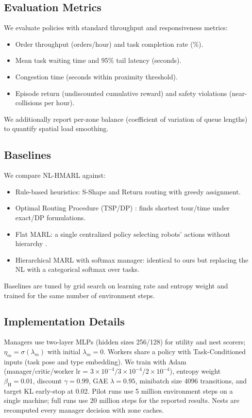 \documentclass[journal,onecolumn]{IEEEtran}
\begin{document}
\subsection{Evaluation Metrics}
We evaluate policies with standard throughput and responsiveness metrics:
\begin{itemize}[leftmargin=1.5em]
  \item Order throughput (orders/hour) and task completion rate (\%).
  \item Mean task waiting time and 95\% tail latency (seconds).
  \item Congestion time (seconds within proximity threshold).
  \item Episode return (undiscounted cumulative reward) and safety violations (near-collisions per hour).
\end{itemize}
We additionally report per-zone balance (coefficient of variation of queue lengths) to quantify spatial load smoothing.

\subsection{Baselines}
We compare NL-HMARL against:
\begin{itemize}[leftmargin=1.5em]
  \item Rule-based heuristics: S-Shape and Return routing \citep{ratliff1983sshape} with greedy assignment.
  \item Optimal Routing Procedure (TSP/DP) \citep{de_koster1997optimal}: finds shortest tour/time under exact/DP formulations.
  \item Flat MARL: a single centralized policy selecting robots' actions without hierarchy \citep{alam2024dqn}.
  \item Hierarchical MARL with softmax manager: identical to ours but replacing the NL with a categorical softmax over tasks.
\end{itemize}
Baselines are tuned by grid search on learning rate and entropy weight and trained for the same number of environment steps.

\subsection{Implementation Details}
Managers use two-layer MLPs (hidden sizes 256/128) for utility and nest scorers; \(\eta_m=\sigma(\lambda_m)\) with initial \(\lambda_m=0\). Workers share a policy with Task-Conditioned inputs (task pose and type embedding). We train with Adam (manager/critic/worker lr = \(3\times10^{-4}/3\times10^{-4}/2\times10^{-4}\)), entropy weight \(\beta_{\mathrm{H}}=0.01\), discount \(\gamma=0.99\), GAE \(\lambda=0.95\), minibatch size 4096 transitions, and target KL early-stop at 0.02. Pilot runs use 5 million environment steps on a single machine; full runs use 20 million steps for the reported results. Nests are recomputed every manager decision with zone caches.
\end{document}
